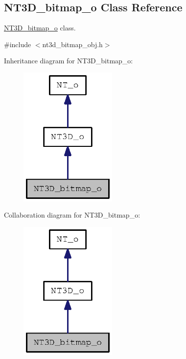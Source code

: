 \subsection{NT3D\_\-bitmap\_\-o Class Reference}
\label{class_n_t3_d__bitmap__o}


\hyperlink{class_n_t3_d__bitmap__o}{NT3D\_\-bitmap\_\-o} class.  




{\ttfamily \#include $<$nt3d\_\-bitmap\_\-obj.h$>$}



Inheritance diagram for NT3D\_\-bitmap\_\-o:
\nopagebreak
\begin{figure}[H]
\begin{center}
\leavevmode
\includegraphics[width=136pt]{class_n_t3_d__bitmap__o__inherit__graph}
\end{center}
\end{figure}


Collaboration diagram for NT3D\_\-bitmap\_\-o:
\nopagebreak
\begin{figure}[H]
\begin{center}
\leavevmode
\includegraphics[width=136pt]{class_n_t3_d__bitmap__o__coll__graph}
\end{center}
\end{figure}
